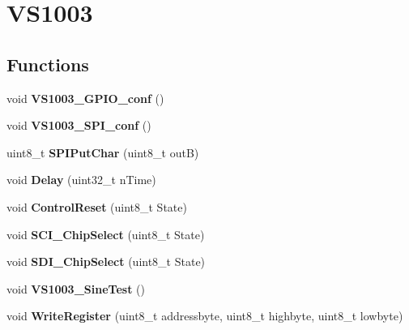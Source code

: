 \hypertarget{group___v_s1003}{
\section{VS1003}
\label{group___v_s1003}
}
\subsection*{Functions}
\begin{DoxyCompactItemize}
\item 
\hypertarget{group___v_s1003_ga285de9bda0f8fa0f1b447d9a64f798aa}{
void {\bfseries VS1003\_\-GPIO\_\-conf} ()}
\label{group___v_s1003_ga285de9bda0f8fa0f1b447d9a64f798aa}

\item 
\hypertarget{group___v_s1003_ga60719e9a42c5c0f05dbc5c2207c961a4}{
void {\bfseries VS1003\_\-SPI\_\-conf} ()}
\label{group___v_s1003_ga60719e9a42c5c0f05dbc5c2207c961a4}

\item 
\hypertarget{group___v_s1003_ga18a561ccd8da4a5b37c243172854f859}{
uint8\_\-t {\bfseries SPIPutChar} (uint8\_\-t outB)}
\label{group___v_s1003_ga18a561ccd8da4a5b37c243172854f859}

\item 
\hypertarget{group___v_s1003_gaa41821cf8fac113b09d880885f5e8efb}{
void {\bfseries Delay} (uint32\_\-t nTime)}
\label{group___v_s1003_gaa41821cf8fac113b09d880885f5e8efb}

\item 
\hypertarget{group___v_s1003_gad7986d53e5b54dc273d2995b72afdc11}{
void {\bfseries ControlReset} (uint8\_\-t State)}
\label{group___v_s1003_gad7986d53e5b54dc273d2995b72afdc11}

\item 
\hypertarget{group___v_s1003_gaf9ec54b39179082b5285b76b41344ea5}{
void {\bfseries SCI\_\-ChipSelect} (uint8\_\-t State)}
\label{group___v_s1003_gaf9ec54b39179082b5285b76b41344ea5}

\item 
\hypertarget{group___v_s1003_ga073775b9854b94e21324e85b9a613756}{
void {\bfseries SDI\_\-ChipSelect} (uint8\_\-t State)}
\label{group___v_s1003_ga073775b9854b94e21324e85b9a613756}

\item 
\hypertarget{group___v_s1003_gaa706493a0f88b1921954d641a31c0560}{
void {\bfseries VS1003\_\-SineTest} ()}
\label{group___v_s1003_gaa706493a0f88b1921954d641a31c0560}

\item 
\hypertarget{group___v_s1003_ga968b6abeabbf8e693ad4fc3af5619bea}{
void {\bfseries WriteRegister} (uint8\_\-t addressbyte, uint8\_\-t highbyte, uint8\_\-t lowbyte)}
\label{group___v_s1003_ga968b6abeabbf8e693ad4fc3af5619bea}


\end{DoxyCompactItemize}
